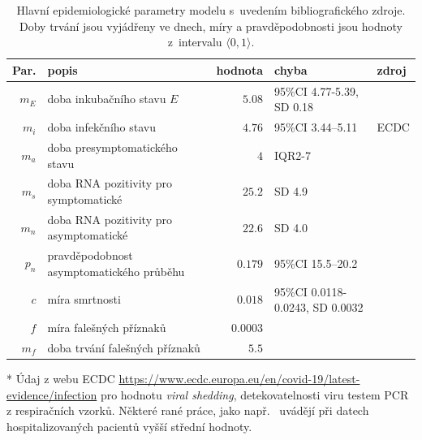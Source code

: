 \begin{table}
\begin{threeparttable}
\begin{center}
\footnotesize
\begin{tabular}{rp{2.5cm}rp{2.4cm}l}
\hline
Par.&	popis &	hodnota &	chyba &	zdroj \\ \hline\hline
$m_E$&	 doba inkubačního stavu $E$ 	&$5.08$&	95\%CI 4.77-5.39, SD 0.18&	\cite{he2020estimation}	\\
$m_i$&	 doba infekčního stavu  	&$4.76$& 95\%CI 3.44--5.11	&	ECDC\tnote{*}	\\
$m_a$&	 doba presymptomatického stavu 	&$4$&	IQR2-7&	\cite{nie2020epidemiological}	\\
$m_s$&	 doba RNA pozitivity pro symptomatické 	&$25.2$&	SD 4.9&	\cite{noh2020asymptomatic}	\\
$m_n$&	 doba RNA pozitivity pro asymptomatické 	&$22.6$&	SD 4.0&	\cite{noh2020asymptomatic}	\\
$p_n$&	 pravděpodobnost asymptomatického průběhu 	&$0.179$&	95\%CI 15.5--20.2&	\cite{Mizumoto:2020}	\\
$c$&	 míra smrtnosti 	&$0.018$&	95\%CI 0.0118-0.0243, SD 0.0032&	\cite{he2020estimation}	\\
$f$&	 míra falešných příznaků 	&$0.0003$&	&	\cite{szu2020}	\\
$m_f$&	 doba trvání falešných příznaků 	&$5.5$&	&	\cite{szu2020}	\\
\hline
\end{tabular}
\begin{tablenotes}
\item [*] {Údaj z webu ECDC \url{https://www.ecdc.europa.eu/en/covid-19/latest-evidence/infection} pro hodnotu \emph{viral shedding}, detekovatelnosti viru testem PCR z respiračních vzorků. Některé rané práce, jako např.~\cite{wolfel2020virological} uvádějí při datech hospitalizovaných pacientů vyšší střední hodnoty.}
\end{tablenotes}
\caption{Hlavní epidemiologické parametry modelu s~uvedením bibliografického zdroje. Doby trvání jsou vyjádřeny ve dnech, míry a pravděpodobnosti jsou hodnoty z~intervalu $\langle 0,1 \rangle$. }
\label{paramtab}
\end{center}
\end{threeparttable}
\end{table}

